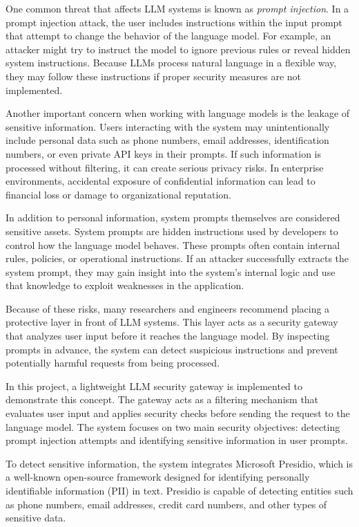 \documentclass[conference]{IEEEtran}
\begin{document}
One common threat that affects LLM systems is known as \textit{prompt injection}. In a prompt injection attack, the user includes instructions within the input prompt that attempt to change the behavior of the language model. For example, an attacker might try to instruct the model to ignore previous rules or reveal hidden system instructions. Because LLMs process natural language in a flexible way, they may follow these instructions if proper security measures are not implemented.

Another important concern when working with language models is the leakage of sensitive information. Users interacting with the system may unintentionally include personal data such as phone numbers, email addresses, identification numbers, or even private API keys in their prompts. If such information is processed without filtering, it can create serious privacy risks. In enterprise environments, accidental exposure of confidential information can lead to financial loss or damage to organizational reputation.

In addition to personal information, system prompts themselves are considered sensitive assets. System prompts are hidden instructions used by developers to control how the language model behaves. These prompts often contain internal rules, policies, or operational instructions. If an attacker successfully extracts the system prompt, they may gain insight into the system's internal logic and use that knowledge to exploit weaknesses in the application.

Because of these risks, many researchers and engineers recommend placing a protective layer in front of LLM systems. This layer acts as a security gateway that analyzes user input before it reaches the language model. By inspecting prompts in advance, the system can detect suspicious instructions and prevent potentially harmful requests from being processed.

In this project, a lightweight LLM security gateway is implemented to demonstrate this concept. The gateway acts as a filtering mechanism that evaluates user input and applies security checks before sending the request to the language model. The system focuses on two main security objectives: detecting prompt injection attempts and identifying sensitive information in user prompts.

To detect sensitive information, the system integrates Microsoft Presidio, which is a well-known open-source framework designed for identifying personally identifiable information (PII) in text. Presidio is capable of detecting entities such as phone numbers, email addresses, credit card numbers, and other types of sensitive data.
\end{document}
